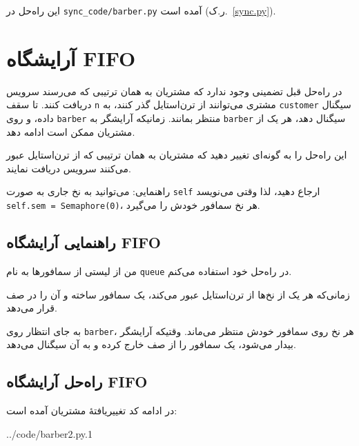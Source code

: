 \documentclass{book}
\newcommand{\clearemptydoublepage}{}%
\begin{document}
    این راه‌حل در \verb"sync_code/barber.py" آمده است (ر.ک.~\ref{sync.py}).
\clearemptydoublepage
\section{آرایشگاه FIFO}

    در راه‌حل قبل تضمینی وجود ندارد که مشتریان به همان ترتیبی که می‌رسند سرویس دریافت کنند.
    تا سقف {\tt n} مشتری می‌توانند از ترن‌استایل گذر کنند، به {\tt customer} سیگنال داده، 
    و روی {\tt barber} منتظر بمانند. زمانیکه آرایشگر به {\tt barber} سیگنال دهد، هر یک از 
    مشتریان ممکن است ادامه دهد.

	این راه‌حل را به گونه‌ای تغییر دهید که مشتریان به همان ترتیبی که از ترن‌استایل عبور می‌کنند سرویس دریافت نمایند.
  
	راهنمایی: می‌توانید به نخ جاری به صورت {\tt self} ارجاع دهید، 
	لذا وقتی می‌نویسد {\tt self.sem = Semaphore(0)}، هر نخ سمافور خودش را می‌گیرد.


\clearemptydoublepage
\subsection{راهنمایی آرایشگاه FIFO}

	من از لیستی از سمافورها به نام {\tt queue} در راه‌حل خود استفاده می‌کنم.

\begin{latin}

\end{latin}

	زمانی‌که هر یک از نخ‌ها از ترن‌استایل عبور می‌کند، یک سمافور ساخته و آن را در صف قرار می‌دهد.

	به جای انتظار روی {\tt barber}، هر نخ روی سمافور خودش منتظر می‌ماند. 
	وقتیکه آرایشگر بیدار می‌شود، یک سمافور را از صف خارج کرده و به آن سیگنال می‌دهد.


\clearemptydoublepage
\subsection{راه‌حل آرایشگاه FIFO}

	در ادامه کد تغییریافتهٔ مشتریان آمده است:

\begin{latin}

{../code/barber2.py.1}
\end{latin}
\end{document}
